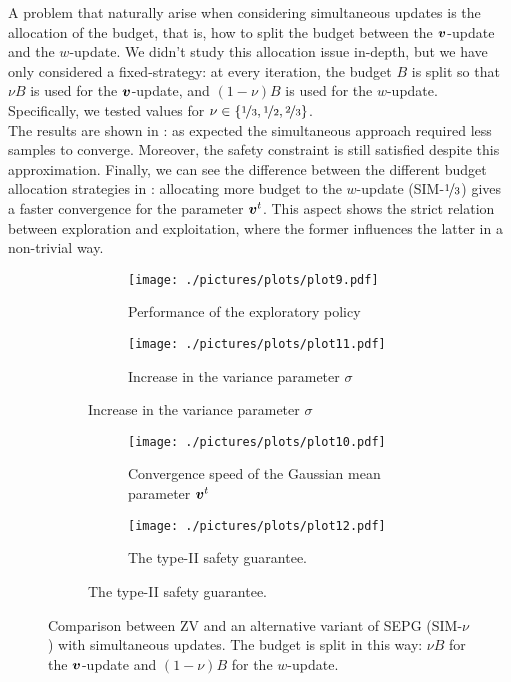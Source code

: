A problem that naturally arise when considering simultaneous updates is the allocation of the budget, that is, how to split the budget between the $\boldsymbol{v}$-update and the $w$-update. We didn't study this allocation issue in-depth, but we have only considered a fixed-strategy: at every iteration, the budget $B$ is split so that $\nu B$ is used for the $\boldsymbol{v}$-update, and $(1-\nu)B$ is used for the $w$-update. Specifically, we tested values for $\nu \in \{\nicefrac{1}{3}, \nicefrac{1}{2}, \nicefrac{2}{3}\}$.\\
The results are shown in : as expected the simultaneous approach required less samples to converge. Moreover, the safety constraint is still satisfied despite this approximation. Finally, we can see the difference between the different budget allocation strategies in : allocating more budget to the $w$-update (SIM-$\nicefrac{1}{3}$) gives a faster convergence for the parameter $\boldsymbol{v}^t$. This aspect shows the strict relation between exploration and exploitation, where the former influences the latter in a non-trivial way.



\begin{figure}[t]
\centering
\begin{subfigure}[t]{\textwidth}
\begin{subfigure}[t]{0.5\textwidth}
\texttt{[image: ./pictures/plots/plot9.pdf]}
\caption{Performance of the exploratory policy} \label{fig:plot3-1}
\end{subfigure}
\hfill
\begin{subfigure}[t]{0.5\textwidth}
\texttt{[image: ./pictures/plots/plot11.pdf]}
\caption{Increase in the variance parameter $\sigma$} \label{fig:plot3-2}
\end{subfigure}
\end{subfigure}

\begin{subfigure}[t]{\textwidth}
\begin{subfigure}[t]{0.5\textwidth}
\texttt{[image: ./pictures/plots/plot10.pdf]}
\caption{Convergence speed of the Gaussian mean parameter $\boldsymbol{v}^t$} \label{fig:plot3-3}
\end{subfigure}
\hfill
\begin{subfigure}[t]{0.5\textwidth}
\texttt{[image: ./pictures/plots/plot12.pdf]}
\caption{The type-II safety guarantee. } \label{fig:plot3-4}
\end{subfigure}
\end{subfigure}

\caption{Comparison between ZV and an alternative variant of SEPG (SIM-$\nu$) with simultaneous updates. The budget is split in this way: $\nu B$ for the $\boldsymbol{v}$-update and $(1-\nu)B$ for the $w$-update. }
\label{fig:plot3}
\end{figure}



